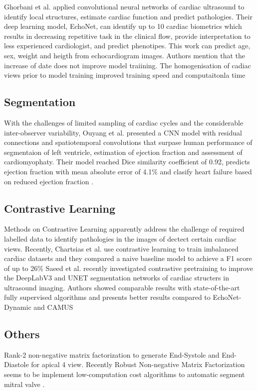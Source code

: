 Ghorbani et al. applied convolutional neural networks of cardiac ultrasound to identify local structures, estimate cardiac function and predict pathologies.
Their deep learning model, EchoNet, can identify up to 10 cardiac biometrics which results in decreasing repetitive task in the clinical flow, provide interpretation to less experienced cardiologist, and predict phenotipes. This work can predict age, sex, weight and heigth from echocardiogram images. 
Authors mention that the increase of date does not improve model traiining. The homogenisation of cadiac views prior to model training improved training speed and computaitonla time
\cite{Ghorbani-DigitalMedicineNature-JAN2020}


\subsection{Segmentation}
With the challenges of limited sampling of cardiac cycles and the considerable inter-observer variability, Ouyang et al. presented a CNN model with residual connections and spatiotemporal convolutions that surpase human performance of segmentaion of left ventricle, estimation of ejection fraction and assessment of cardiomyophaty. 
Their model reached Dice similarity coefficient of 0.92, predicts ejection fraction with mean absolute error of 4.1\% and clasify heart failure based on reduced ejection fraction 
\cite{Ouyang-Nature-APR2020}.


\subsection{Contrastive Learning}
Methods on Contrastive Learning apparently address the challenge of required labelled data to identify pathologies in the images of dectect certain cardiac views.
Recently, Chartsias et al. use contrastive learning to train imbalanced cardiac datasets and they compared a naive baseline model to achieve a F1 score of up to 26\% \cite{chartsias2021-ASMUS}
Saeed et al. recently investigated contrastive pretraining to improve the DeepLabV3 and UNET segmentation networks of cardiac structers in ultrasound imaging.
Authors showed comparable results with state-of-the-art fully supervised algorithms and presents better results compared to EchoNet-Dynamic and CAMUS \cite{saeed2021MIDL}

\subsection{Others}
Rank-2 non-negative matrix factorization \cite{yuan2017} to generate End-Systole and End-Diastole for apical 4 view.  
Recently Robust Non-negative Matrix Factorization seems to be implement low-computation cost algorithms to automatic segment mitral valve \cite{dukler2018}.





